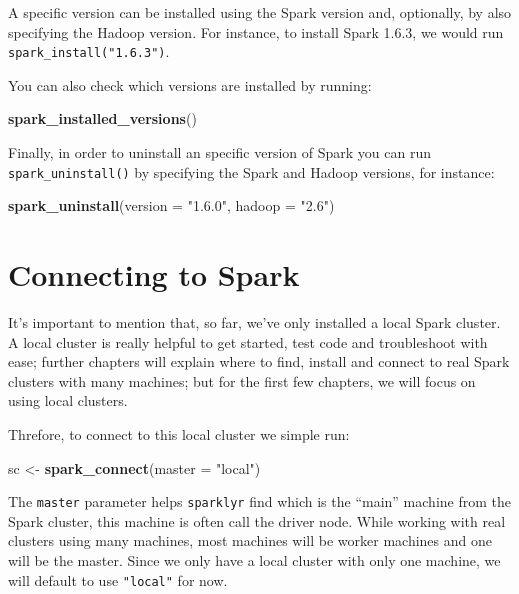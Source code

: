 \documentclass[]{book}
\newenvironment{Shaded}{\begin{snugshade}}{\end{snugshade}}
\newcommand{\DataTypeTok}[1]{\textcolor[rgb]{0.13,0.29,0.53}{#1}}
\newcommand{\KeywordTok}[1]{\textcolor[rgb]{0.13,0.29,0.53}{\textbf{#1}}}
\newcommand{\NormalTok}[1]{#1}
\newcommand{\StringTok}[1]{\textcolor[rgb]{0.31,0.60,0.02}{#1}}
\theoremstyle{definition}
\theoremstyle{definition}
\theoremstyle{definition}
\theoremstyle{remark}
\begin{document}
A specific version can be installed using the Spark version and,
optionally, by also specifying the Hadoop version. For instance, to
install Spark 1.6.3, we would run \texttt{spark\_install("1.6.3")}.

You can also check which versions are installed by running:

\begin{Shaded}
\begin{Highlighting}[]
\KeywordTok{spark_installed_versions}\NormalTok{()}
\end{Highlighting}
\end{Shaded}

Finally, in order to uninstall an specific version of Spark you can run
\texttt{spark\_uninstall()} by specifying the Spark and Hadoop versions,
for instance:

\begin{Shaded}
\begin{Highlighting}[]
\KeywordTok{spark_uninstall}\NormalTok{(}\DataTypeTok{version =} \StringTok{"1.6.0"}\NormalTok{, }\DataTypeTok{hadoop =} \StringTok{"2.6"}\NormalTok{)}
\end{Highlighting}
\end{Shaded}

\hypertarget{connecting-to-spark}{%
\section{Connecting to Spark}\label{connecting-to-spark}}

It's important to mention that, so far, we've only installed a local
Spark cluster. A local cluster is really helpful to get started, test
code and troubleshoot with ease; further chapters will explain where to
find, install and connect to real Spark clusters with many machines; but
for the first few chapters, we will focus on using local clusters.

Threfore, to connect to this local cluster we simple run:

\begin{Shaded}
\begin{Highlighting}[]
\NormalTok{sc <-}\StringTok{ }\KeywordTok{spark_connect}\NormalTok{(}\DataTypeTok{master =} \StringTok{"local"}\NormalTok{)}
\end{Highlighting}
\end{Shaded}

The \texttt{master} parameter helps \texttt{sparklyr} find which is the
``main'' machine from the Spark cluster, this machine is often call the
driver node. While working with real clusters using many machines, most
machines will be worker machines and one will be the master. Since we
only have a local cluster with only one machine, we will default to use
\texttt{"local"} for now.
\end{document}
